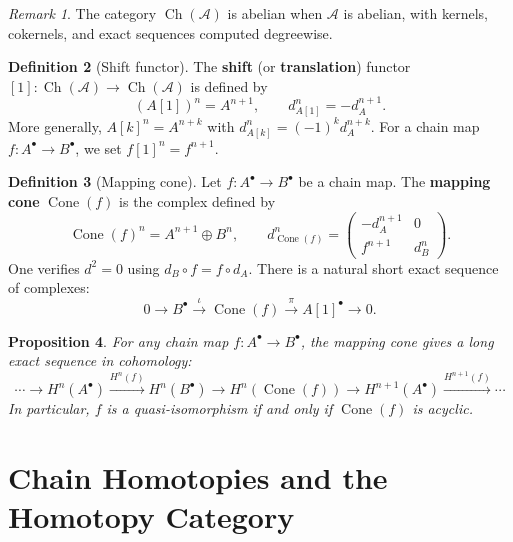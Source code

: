 \documentclass[a4paper,12pt]{book}
\theoremstyle{definition}
\newtheorem{definition}{Definition}[section]
\theoremstyle{plain}
\newtheorem{proposition}[definition]{Proposition}
\theoremstyle{remark}
\newtheorem{remark}[definition]{Remark}
\begin{document}
\begin{remark}\label{rem:ch-abelian}
The category $\operatorname{Ch}(\mathcal{A})$ is abelian when $\mathcal{A}$ is abelian,
with kernels, cokernels, and exact sequences computed degreewise.
\end{remark}

\begin{definition}[Shift functor]\label{def:shift-functor}
The \textbf{shift} (or \textbf{translation}) functor $[1] \colon \operatorname{Ch}(\mathcal{A})
\to \operatorname{Ch}(\mathcal{A})$ is defined by
\[
    (A[1])^n = A^{n+1}, \qquad d_{A[1]}^n = -d_A^{n+1}.
\]
More generally, $A[k]^n = A^{n+k}$ with $d_{A[k]}^n = (-1)^k d_A^{n+k}$.
For a chain map $f \colon A^\bullet \to B^\bullet$, we set $f[1]^n = f^{n+1}$.
\end{definition}

\begin{definition}[Mapping cone]\label{def:mapping-cone}
Let $f \colon A^\bullet \to B^\bullet$ be a chain map. The \textbf{mapping cone}
$\operatorname{Cone}(f)$ is the complex defined by
\[
    \operatorname{Cone}(f)^n = A^{n+1} \oplus B^n, \qquad
    d_{\operatorname{Cone}(f)}^n = \begin{pmatrix} -d_A^{n+1} & 0 \\ f^{n+1} & d_B^n \end{pmatrix}.
\]
One verifies $d^2 = 0$ using $d_B \circ f = f \circ d_A$.
There is a natural short exact sequence of complexes:
\[
    0 \longrightarrow B^\bullet \xrightarrow{\;\iota\;} \operatorname{Cone}(f)
    \xrightarrow{\;\pi\;} A[1]^\bullet \longrightarrow 0.
\]
\end{definition}

\begin{proposition}\label{prop:cone-les}
For any chain map $f \colon A^\bullet \to B^\bullet$, the mapping cone gives a long exact
sequence in cohomology:
\[
    \cdots \to H^n(A^\bullet) \xrightarrow{H^n(f)} H^n(B^\bullet) \to
    H^n(\operatorname{Cone}(f)) \to H^{n+1}(A^\bullet) \xrightarrow{H^{n+1}(f)} \cdots
\]
In particular, $f$ is a quasi-isomorphism if and only if $\operatorname{Cone}(f)$ is acyclic.
\end{proposition}


\section{Chain Homotopies and the Homotopy Category}\label{sec:homotopy-cat}
\end{document}
